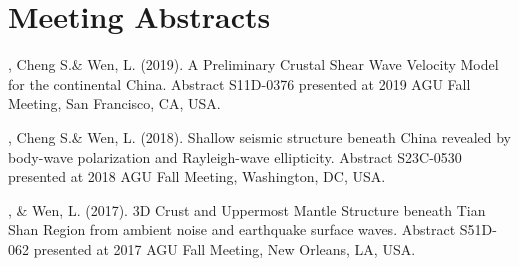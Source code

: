 \section*{Meeting Abstracts}
\begin{etaremune}
\item
    \Xiao, Cheng S.\& Wen, L. (2019).
    A Preliminary Crustal Shear Wave Velocity Model for the continental China. 
    Abstract S11D-0376 presented at 2019 AGU Fall Meeting, San Francisco, CA, USA.

\item
    \Xiao, Cheng S.\& Wen, L. (2018).
    Shallow seismic structure beneath China revealed by body-wave polarization and Rayleigh-wave ellipticity. 
    Abstract S23C-0530 presented at 2018 AGU Fall Meeting, Washington, DC, USA.
\item
    \Xiao, \& Wen, L. (2017).
    3D Crust and Uppermost Mantle Structure beneath Tian Shan Region from ambient noise and earthquake surface waves. 
    Abstract S51D-062 presented at 2017 AGU Fall Meeting, New Orleans, LA, USA.
\end{etaremune}

